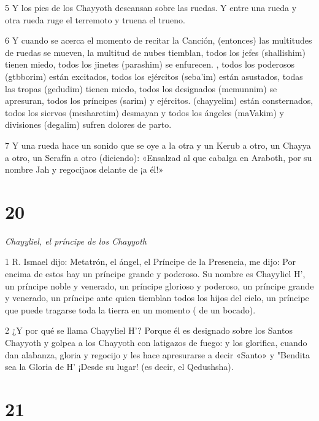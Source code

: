 \par 5 Y los pies de los Chayyoth descansan sobre las ruedas. Y entre una rueda y otra rueda ruge el terremoto y truena el trueno.

\par 6 Y cuando se acerca el momento de recitar la Canción, (entonces) las multitudes de ruedas se mueven, la multitud de nubes tiemblan, todos los jefes (shallishim) tienen miedo, todos los jinetes (parashim) se enfurecen. , todos los poderosos (gtbborim) están excitados, todos los ejércitos (seba'im) están asustados, todas las tropas (gedudim) tienen miedo, todos los designados (memunnim) se apresuran, todos los príncipes (sarim) y ejércitos. (chayyelim) están consternados, todos los siervos (mesharetim) desmayan y todos los ángeles (maVakim) y divisiones (degalim) sufren dolores de parto.

\par 7 Y una rueda hace un sonido que se oye a la otra y un Kerub a otro, un Chayya a otro, un Serafín a otro (diciendo): «Ensalzad al que cabalga en Araboth, por su nombre Jah y regocijaos delante de ¡a él!»

\chapter{20}

\par \textit{Chayyliel, el príncipe de los Chayyoth}

\par 1 R. Ismael dijo: Metatrón, el ángel, el Príncipe de la Presencia, me dijo: Por encima de estos hay un príncipe grande y poderoso. Su nombre es Chayyliel H', un príncipe noble y venerado, un príncipe glorioso y poderoso, un príncipe grande y venerado, un príncipe ante quien tiemblan todos los hijos del cielo, un príncipe que puede tragarse toda la tierra en un momento ( de un bocado).

\par 2 ¿Y por qué se llama Chayyliel H'? Porque él es designado sobre los Santos Chayyoth y golpea a los Chayyoth con latigazos de fuego: y los glorifica, cuando dan alabanza, gloria y regocijo y les hace apresurarse a decir «Santo» y "Bendita sea la Gloria de H' ¡Desde su lugar! (es decir, el Qedushsha).

\chapter{21}

